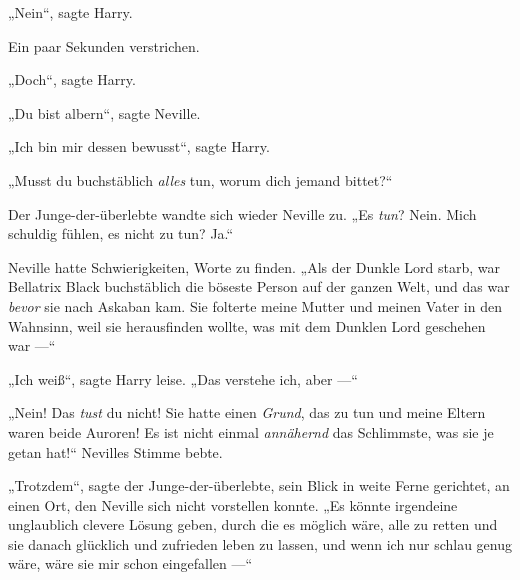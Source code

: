 „Nein“, sagte Harry.

Ein paar Sekunden verstrichen.

„Doch“, sagte Harry.

„Du bist albern“, sagte Neville.

„Ich bin mir dessen bewusst“, sagte Harry.

„Musst du buchstäblich \emph{alles} tun, worum dich jemand bittet?“

Der Junge-der-überlebte wandte sich wieder Neville zu.
„Es \emph{tun}? Nein. Mich schuldig fühlen, es nicht zu tun? Ja.“

Neville hatte Schwierigkeiten, Worte zu finden.
„Als der Dunkle Lord starb, war Bellatrix Black buchstäblich die böseste Person auf der ganzen Welt, und das war \emph{bevor} sie nach Askaban kam. Sie folterte meine Mutter und meinen Vater in den Wahnsinn, weil sie herausfinden wollte, was mit dem Dunklen Lord geschehen war —“

„Ich weiß“, sagte Harry leise.
„Das verstehe ich, aber —“

„Nein! Das \emph{tust} du nicht! Sie hatte einen \emph{Grund}, das zu tun und meine Eltern waren beide Auroren! Es ist nicht einmal \emph{annähernd} das Schlimmste, was sie je getan hat!“ Nevilles Stimme bebte.

„Trotzdem“, sagte der Junge-der-überlebte, sein Blick in weite Ferne gerichtet, an einen Ort, den Neville sich nicht vorstellen konnte.
„Es könnte irgendeine unglaublich clevere Lösung geben, durch die es möglich wäre, alle zu retten und sie danach glücklich und zufrieden leben zu lassen, und wenn ich nur schlau genug wäre, wäre sie mir schon eingefallen —“

